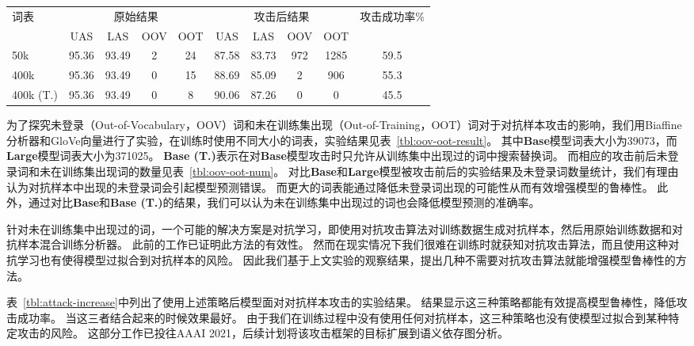 \begin{table}[ht]
    \vspace{0.5em}\centering\wuhao
	\begin{tabular}{lccccccccc}
		\toprule[1.5pt]
		\multirow{2}{*}{词表}& \multicolumn{4}{c}{原始结果} & \multicolumn{4}{c}{攻击后结果} & \multirow{2}{*}{攻击成功率\%} \\
		\cmidrule(r){2-5} \cmidrule(r){6-9}
		&UAS &LAS &OOV &OOT &UAS &LAS &OOV &OOT \\
		\midrule[1pt]
		50k  &95.36 &93.49 &2  &24 &87.58 &83.73 &972 &1285 &59.5 \\
		400k &95.36 &93.49 &0  &15 &88.69 &85.09 &2       &906  &55.3 \\
		400k (T.) &95.36 &93.49 &0  &8  &90.06 &87.26 &0 &0 &45.5 \\
		\bottomrule[1.5pt]
	\end{tabular}
\end{table}


为了探究未登录（Out-of-Vocabulary，OOV）词和未在训练集出现（Out-of-Training，OOT）词对于对抗样本攻击的影响，我们用Biaffine分析器和GloVe向量进行了实验，在训练时使用不同大小的词表，实验结果见表~\ref{tbl:oov-oot-result}。
其中\textbf{Base}模型词表大小为39073，而\textbf{Large}模型词表大小为371025。
\textbf{Base (T.)}表示在对\textbf{Base}模型攻击时只允许从训练集中出现过的词中搜索替换词。
而相应的攻击前后未登录词和未在训练集出现词的数量见表~\ref{tbl:oov-oot-num}。
对比\textbf{Base}和\textbf{Large}模型被攻击前后的实验结果及未登录词数量统计，我们有理由认为对抗样本中出现的未登录词会引起模型预测错误。
而更大的词表能通过降低未登录词出现的可能性从而有效增强模型的鲁棒性。
此外，通过对比\textbf{Base}和\textbf{Base (T.)}的结果，我们可以认为未在训练集中出现过的词也会降低模型预测的准确率。

针对未在训练集中出现过的词，一个可能的解决方案是对抗学习，即使用对抗攻击算法对训练数据生成对抗样本，然后用原始训练数据和对抗样本混合训练分析器。
此前的工作\cite{zheng2020evaluating}已证明此方法的有效性。
然而在现实情况下我们很难在训练时就获知对抗攻击算法，而且使用这种对抗学习也有使得模型过拟合到对抗样本的风险。
因此我们基于上文实验的观察结果，提出几种不需要对抗攻击算法就能增强模型鲁棒性的方法。

表~\ref{tbl:attack-increase}中列出了使用上述策略后模型面对对抗样本攻击的实验结果。
结果显示这三种策略都能有效提高模型鲁棒性，降低攻击成功率。
当这三者结合起来的时候效果最好。
由于我们在训练过程中没有使用任何对抗样本，这三种策略也没有使模型过拟合到某种特定攻击的风险。
这部分工作已投往AAAI 2021，后续计划将该攻击框架的目标扩展到语义依存图分析。


